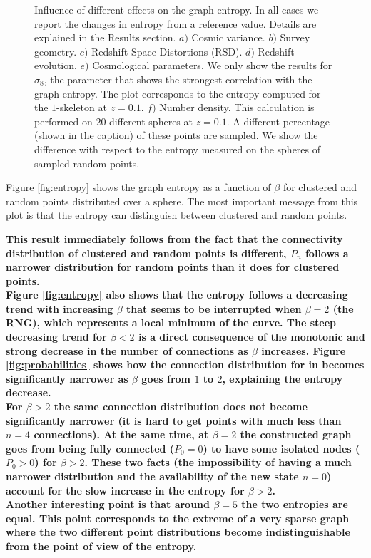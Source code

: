 \documentclass[fleqn,usenatbib]{mnras}
\begin{document}
\begin{figure}
    \caption{Influence of different effects on the graph entropy. In all cases we 
    report the changes in entropy from a reference value. 
    Details are explained in the Results section. $a)$ Cosmic variance. 
    $b)$ Survey geometry. 
    $c)$ Redshift Space Distortions (RSD).
    $d)$ Redshift evolution.
    $e)$ Cosmological parameters. We only show the results for $\sigma_8$, 
    the parameter that shows the strongest correlation with the graph entropy.
    The plot corresponds to the entropy computed for the $1$-skeleton at $z=0.1$. 
    $f)$ Number density. 
    This calculation is performed on $20$ different spheres at $z=0.1$.
    A different percentage (shown in the caption) of these points are sampled. 
    We show the difference with respect to the entropy measured on the spheres 
    of sampled random points.\label{fig:diferencias}}
\end{figure}    


Figure \ref{fig:entropy} shows the graph entropy as a function of $\beta$ for
clustered and random points distributed over a sphere.
The most important message from this plot is that the entropy can distinguish between
clustered and random points.

\textbf{This result immediately follows from the fact that the connectivity distribution of clustered and random points is different, $P_n$ follows a narrower distribution for random points than it does for clustered points.\\
\indent
Figure \ref{fig:entropy} also shows that the entropy follows a decreasing trend with increasing $\beta$ that seems to be interrupted when $\beta=2$ (the RNG), which represents a local minimum of the curve.
The steep decreasing trend for $\beta<2$ is a direct consequence of the monotonic and strong decrease in the number of connections as $\beta$ increases.
Figure \ref{fig:probabilities} shows how the connection distribution for in  becomes significantly narrower as $\beta$ goes from $1$ to $2$, explaining the entropy decrease.\\
\indent
For $\beta>2$ the same connection distribution does not become significantly narrower (it is hard to get points with much less than $n=4$ connections).
At the same time, at $\beta=2$ the constructed graph goes from
being fully connected ($P_0=0$) to have some isolated nodes ($P_0>0$) for $\beta>2$.
These two facts (the impossibility of having a much narrower distribution and the availability of the new state $n=0$) account for the slow increase in the entropy for $\beta>2$.\\
\indent
Another interesting point is that around $\beta=5$ the two entropies
are equal.  
This point corresponds to the extreme of a very sparse graph where the
two different point distributions become indistinguishable from the
point of view of the entropy. 
}
\end{document}
